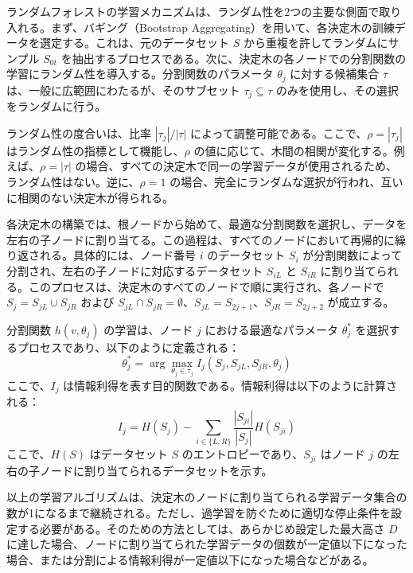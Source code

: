 \documentclass[platex]{suribt}
\begin{document}
ランダムフォレストの学習メカニズムは、ランダム性を2つの主要な側面で取り入れる。まず、バギング（Bootstrap Aggregating）を用いて、各決定木の訓練データを選定する。これは、元のデータセット \(S\) から重複を許してランダムにサンプル \(S_{0t}\) を抽出するプロセスである。次に、決定木の各ノードでの分割関数の学習にランダム性を導入する。分割関数のパラメータ \(\theta_j\) に対する候補集合 \(\tau\) は、一般に広範囲にわたるが、そのサブセット \(\tau_j \subseteq \tau\) のみを使用し、その選択をランダムに行う。

ランダム性の度合いは、比率 \(|\tau_j| / |\tau|\) によって調整可能である。ここで、\(\rho = |\tau_j|\) はランダム性の指標として機能し、\(\rho\) の値に応じて、木間の相関が変化する。例えば、\(\rho = |\tau|\) の場合、すべての決定木で同一の学習データが使用されるため、ランダム性はない。逆に、\(\rho = 1\) の場合、完全にランダムな選択が行われ、互いに相関のない決定木が得られる。

各決定木の構築では、根ノードから始めて、最適な分割関数を選択し、データを左右の子ノードに割り当てる。この過程は、すべてのノードにおいて再帰的に繰り返される。具体的には、ノード番号 \(i\) のデータセット \(S_i\) が分割関数によって分割され、左右の子ノードに対応するデータセット \(S_{iL}\) と \(S_{iR}\) に割り当てられる。このプロセスは、決定木のすべてのノードで順に実行され、各ノードで \(S_j = S_{jL} \cup S_{jR}\) および \(S_{jL} \cap S_{jR} = \emptyset\)、\(S_{jL} = S_{2j+1}\)、\(S_{jR} = S_{2j+2}\) が成立する。

分割関数 \(h(v, \theta_j)\) の学習は、ノード \(j\) における最適なパラメータ \(\theta_j^*\) を選択するプロセスであり、以下のように定義される：
\begin{equation}
\theta_j^* = \arg \max_{\theta_j \in \tau_j} I_j(S_j, S_{jL}, S_{jR}, \theta_j)
\end{equation}
ここで、\(I_j\) は情報利得を表す目的関数である。情報利得は以下のように計算される：
\begin{equation}
I_j = H(S_j) - \sum_{i \in \{L, R\}} \frac{|S_{ji}|}{|S_j|} H(S_{ji})
\end{equation}
ここで、\(H(S)\) はデータセット \(S\) のエントロピーであり、\(S_{ji}\) はノード \(j\) の左右の子ノードに割り当てられるデータセットを示す。

以上の学習アルゴリズムは、決定木のノードに割り当てられる学習データ集合の数が1になるまで継続される。ただし、過学習を防ぐために適切な停止条件を設定する必要がある。そのための方法としては、あらかじめ設定した最大高さ \(D\) に達した場合、ノードに割り当てられた学習データの個数が一定値以下になった場合、または分割による情報利得が一定値以下になった場合などがある。
\end{document}
